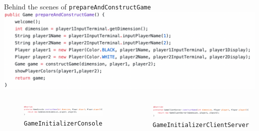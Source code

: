 \documentclass{beamer}
\begin{document}
\begin{frame}{Behind the scenes of \texttt{prepareAndConstructGame}}
\center \includegraphics[scale=0.4]{images/prepareandconstruct.png}
\begin{columns}\hspace{-0.5cm}
			\begin{figure}
				\includegraphics[scale=0.24]{images/constructconsole.png}
				\caption*{\hspace{-0.2cm}\texttt{GameInitializerConsole}}
			\end{figure}
					
			\begin{figure}
				\includegraphics[scale=0.24]{images/constructcs.png}
				\caption*{\texttt{GameInitializerClientServer}}
			\end{figure}
		
	\end{columns}

\end{frame}
\end{document}
